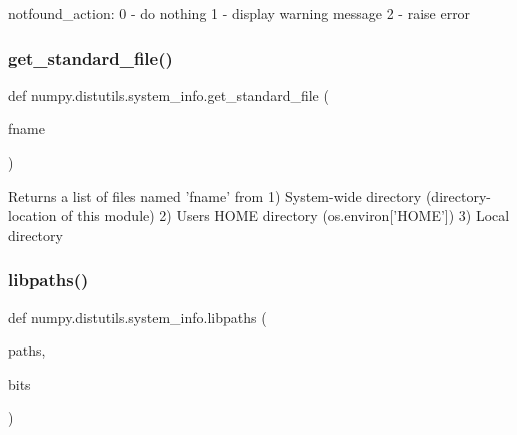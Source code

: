 \begin{DoxyVerb}notfound_action:
  0 - do nothing
  1 - display warning message
  2 - raise error
\end{DoxyVerb}
 \mbox{\label{namespacenumpy_1_1distutils_1_1system__info_a3f62ecee14b262e1140931a4b907e927}} 
\subsubsection{\texorpdfstring{get\+\_\+standard\+\_\+file()}{get\_standard\_file()}}
{\footnotesize\ttfamily def numpy.\+distutils.\+system\+\_\+info.\+get\+\_\+standard\+\_\+file (\begin{DoxyParamCaption}\item[{}]{fname }\end{DoxyParamCaption})}

\begin{DoxyVerb}Returns a list of files named 'fname' from
1) System-wide directory (directory-location of this module)
2) Users HOME directory (os.environ['HOME'])
3) Local directory
\end{DoxyVerb}
 \mbox{\label{namespacenumpy_1_1distutils_1_1system__info_aa4e9bba0afb772596401b292857b467d}} 
\subsubsection{\texorpdfstring{libpaths()}{libpaths()}}
{\footnotesize\ttfamily def numpy.\+distutils.\+system\+\_\+info.\+libpaths (\begin{DoxyParamCaption}\item[{}]{paths,  }\item[{}]{bits }\end{DoxyParamCaption})}

